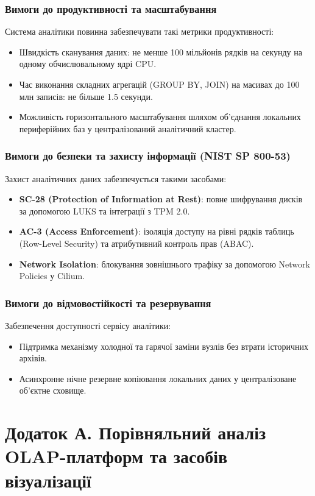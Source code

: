 \documentclass{article}
\begin{document}
\subsubsection{Вимоги до продуктивності та масштабування}
Система аналітики повинна забезпечувати такі метрики продуктивності:
\begin{itemize}
    \item Швидкість сканування даних: не менше 100 мільйонів рядків на секунду на одному обчислювальному ядрі CPU.
    \item Час виконання складних агрегацій (GROUP BY, JOIN) на масивах до 100 млн записів: не більше 1.5 секунди.
    \item Можливість горизонтального масштабування шляхом об'єднання локальних периферійних баз у централізований аналітичний кластер.
\end{itemize}

\subsubsection{Вимоги до безпеки та захисту інформації (NIST SP 800-53)}
Захист аналітичних даних забезпечується такими засобами:
\begin{itemize}
    \item \textbf{SC-28 (Protection of Information at Rest)}: повне шифрування дисків за допомогою LUKS та інтеграції з TPM 2.0.
    \item \textbf{AC-3 (Access Enforcement)}: ізоляція доступу на рівні рядків таблиць (Row-Level Security) та атрибутивний контроль прав (ABAC).
    \item \textbf{Network Isolation}: блокування зовнішнього трафіку за допомогою Network Policies у Cilium.
\end{itemize}

\subsubsection{Вимоги до відмовостійкості та резервування}
Забезпечення доступності сервісу аналітики:
\begin{itemize}
    \item Підтримка механізму холодної та гарячої заміни вузлів без втрати історичних архівів.
    \item Асинхронне нічне резервне копіювання локальних даних у централізоване об'єктне сховище.
\end{itemize}

\newpage
\section{Додаток А. Порівняльний аналіз OLAP-платформ та засобів візуалізації}
\end{document}
